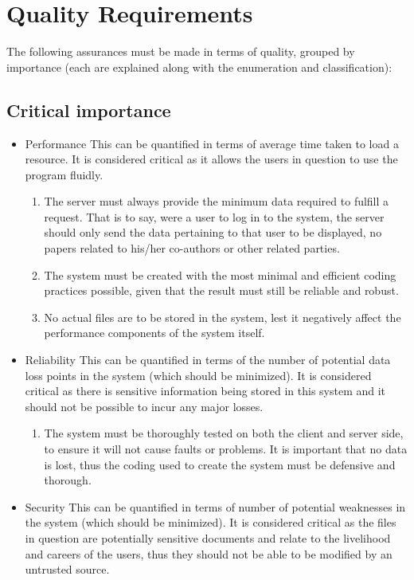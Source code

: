 	\section{Quality Requirements}
	The following assurances must be made in terms of quality, grouped by importance (each are explained along with the enumeration and classification):
		
	\subsection{Critical importance}
		\begin{itemize}
			\item Performance
			This can be quantified in terms of average time taken to load a resource. It is considered critical as it allows the users in question to use the program fluidly.
			\begin{enumerate}
				\item The server must always provide the minimum data required to fulfill a request. That is to say, were a user to log in to the system, the server should only send the data pertaining to that user to be displayed, no papers related to his/her co-authors or other related parties. 
				\item The system must be created with the most minimal and efficient coding practices possible, given that the result must still be reliable and robust.
				\item No actual files are to be stored in the system, lest it negatively affect the performance components of the system itself.
			\end{enumerate}
			\item Reliability
			This can be quantified in terms of the number of potential data loss points in the system (which should be minimized). It is considered critical as there is sensitive information being stored in this system and it should not be possible to incur any major losses.
			\begin{enumerate}
				\item The system must be thoroughly tested on both the client and server side, to ensure it will not cause faults or problems. It is important that no data is lost, thus the coding used to create the system must be defensive and thorough.
			\end{enumerate}
			\item Security
			This can be quantified in terms of number of potential weaknesses in the system (which should be minimized). It is considered critical as the files in question are potentially sensitive documents and relate to the livelihood and careers of the users, thus they should not be able to be modified by an untrusted source.

\end{itemize}
